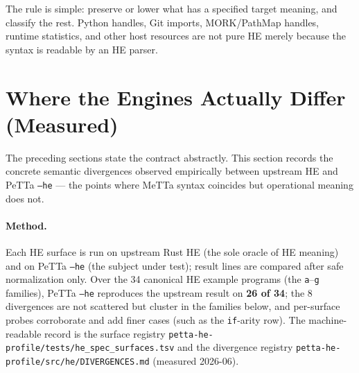 \documentclass[11pt]{article}
\newcommand{\code}[1]{\texttt{#1}}
\newcommand{\HE}{\textup{HE}}
\newcommand{\PeTTa}{\textup{PeTTa}}
\begin{document}
The rule is simple: preserve or lower what has a specified target meaning, and
classify the rest.  Python handles, Git imports, MORK/PathMap handles, runtime
statistics, and other host resources are not pure \HE{} merely because the
syntax is readable by an \HE{} parser.

\section{Where the Engines Actually Differ (Measured)}

The preceding sections state the contract abstractly.  This section records the
concrete semantic divergences observed empirically between upstream \HE{} and
\PeTTa{} \code{--he} --- the points where MeTTa syntax coincides but operational
meaning does not.

\paragraph{Method.}
Each \HE{} surface is run on upstream Rust \HE{} (the sole oracle of \HE{}
meaning) and on \PeTTa{} \code{--he} (the subject under test); result lines are
compared after safe normalization only.  Over the 34 canonical \HE{} example
programs (the \code{a}--\code{g} families), \PeTTa{} \code{--he} reproduces the
upstream result on \textbf{26 of 34}; the 8 divergences are not scattered but
cluster in the families below, and per-surface probes corroborate and add finer
cases (such as the \code{if}-arity row).  The machine-readable record is the
surface registry \code{petta-he-profile/tests/he\_spec\_surfaces.tsv} and the
divergence registry \code{petta-he-profile/src/he/DIVERGENCES.md} (measured
2026-06).
\end{document}
